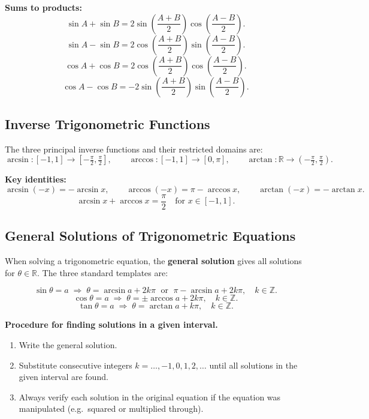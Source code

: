 \documentclass[12pt]{article}
\begin{document}
\textbf{Sums to products:}
\[
\sin A + \sin B = 2\sin\!\left(\frac{A+B}{2}\right)\cos\!\left(\frac{A-B}{2}\right).
\]
\[
\sin A - \sin B = 2\cos\!\left(\frac{A+B}{2}\right)\sin\!\left(\frac{A-B}{2}\right).
\]
\[
\cos A + \cos B = 2\cos\!\left(\frac{A+B}{2}\right)\cos\!\left(\frac{A-B}{2}\right).
\]
\[
\cos A - \cos B = -2\sin\!\left(\frac{A+B}{2}\right)\sin\!\left(\frac{A-B}{2}\right).
\]

\subsection{Inverse Trigonometric Functions}

The three principal inverse functions and their restricted domains are:
\[
\arcsin : [-1,1] \to \left[-\tfrac{\pi}{2}, \tfrac{\pi}{2}\right], \qquad
\arccos : [-1,1] \to [0, \pi], \qquad
\arctan : \mathbb{R} \to \left(-\tfrac{\pi}{2}, \tfrac{\pi}{2}\right).
\]

\textbf{Key identities:}
\[
\arcsin(-x) = -\arcsin x, \qquad \arccos(-x) = \pi - \arccos x, \qquad \arctan(-x) = -\arctan x.
\]
\[
\arcsin x + \arccos x = \frac{\pi}{2} \quad \text{for } x \in [-1,1].
\]

\subsection{General Solutions of Trigonometric Equations}

When solving a trigonometric equation, the \textbf{general solution} gives all solutions
for $\theta \in \mathbb{R}$. The three standard templates are:

\[
\sin\theta = a \;\Rightarrow\; \theta = \arcsin a + 2k\pi \;\text{ or }\; \pi - \arcsin a + 2k\pi, \quad k \in \mathbb{Z}.
\]
\[
\cos\theta = a \;\Rightarrow\; \theta = \pm\arccos a + 2k\pi, \quad k \in \mathbb{Z}.
\]
\[
\tan\theta = a \;\Rightarrow\; \theta = \arctan a + k\pi, \quad k \in \mathbb{Z}.
\]

\textbf{Procedure for finding solutions in a given interval.}
\begin{enumerate}[leftmargin=*]
  \item Write the general solution.
  \item Substitute consecutive integers $k = \ldots, -1, 0, 1, 2, \ldots$ until all
        solutions in the given interval are found.
  \item Always verify each solution in the original equation if the equation was
        manipulated (e.g.\ squared or multiplied through).
\end{enumerate}
\end{document}
